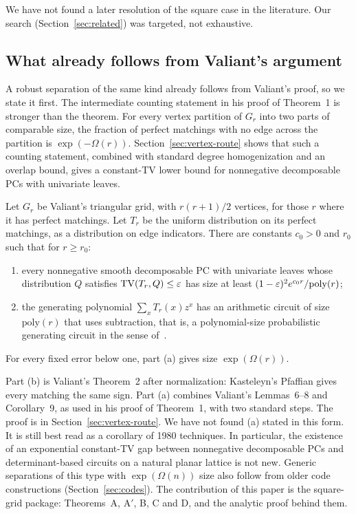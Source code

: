 We have not found a later resolution of the square case in the literature. Our search (Section~\ref{sec:related}) was targeted, not exhaustive.

\subsection{What already follows from Valiant's argument}\label{sec:intro-triangular}

A robust separation of the same kind already follows from Valiant's proof, so we state it first. The intermediate counting statement in his proof of Theorem~1 \cite[pp.~311--312]{Valiant80} is stronger than the theorem. For every vertex partition of $G_r$ into two parts of comparable size, the fraction of perfect matchings with no edge across the partition is $\exp(-\Omega(r))$. Section~\ref{sec:vertex-route} shows that such a counting statement, combined with standard degree homogenization and an overlap bound, gives a constant-TV lower bound for nonnegative decomposable PCs with univariate leaves.

\begin{proposition}\label{prop:triangular}
Let $G_r$ be Valiant's triangular grid, with $r(r+1)/2$ vertices, for those $r$ where it has perfect matchings. Let $T_r$ be the uniform distribution on its perfect matchings, as a distribution on edge indicators. There are constants $c_0>0$ and $r_0$ such that for $r\ge r_0$:
\begin{enumerate}[label=(\alph*)]
\item every nonnegative smooth decomposable PC with univariate leaves whose distribution $Q$ satisfies $\mathrm{TV}(T_r,Q)\le\varepsilon$ has size at least $(1-\varepsilon)^2e^{c_0r}/\mathrm{poly}(r)$;
\item the generating polynomial $\sum_x T_r(x)z^x$ has an arithmetic circuit of size $\mathrm{poly}(r)$ that uses subtraction, that is, a polynomial-size probabilistic generating circuit in the sense of~\cite{ZhangJubaVdB21}.
\end{enumerate}
For every fixed error below one, part (a) gives size $\exp(\Omega(r))$.
\end{proposition}

Part (b) is Valiant's Theorem~2 after normalization: Kasteleyn's Pfaffian gives every matching the same sign. Part (a) combines Valiant's Lemmas~6--8 and Corollary~9, as used in his proof of Theorem~1, with two standard steps. The proof is in Section~\ref{sec:vertex-route}. We have not found (a) stated in this form. It is still best read as a corollary of 1980 techniques. In particular, the existence of an exponential constant-TV gap between nonnegative decomposable PCs and determinant-based circuits on a natural planar lattice is not new. Generic separations of this type with $\exp(\Omega(n))$ size also follow from older code constructions (Section~\ref{sec:codes}). The contribution of this paper is the square-grid package: Theorems~A, A$'$, B, C and D, and the analytic proof behind them.

